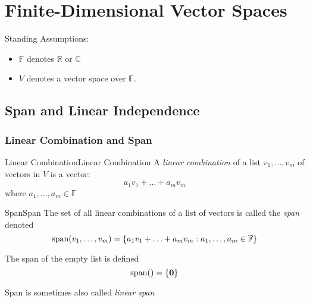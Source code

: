 \documentclass[../main.tex]{subfiles}
\begin{document}
\chapter{Finite-Dimensional Vector Spaces}

\begin{plainblackenv}
Standing Assumptions:
\tcblower\par
\begin{itemize}
\item $\mathbb{F}$ denotes $\mathbb{R}$ or $\mathbb{C}$ 
\item $V$ denotes a vector space over $\mathbb{F}$.
\end{itemize}
\end{plainblackenv}

\section{Span and Linear Independence}
\subsection{Linear Combination and Span}

\begin{definition}{Linear Combination}{Linear Combination}
A \emph{linear combination} of a list $v_1, \ldots ,v_m$ of vectors in $V$ is a vector:
\begin{equation}
a_1v_1+\ldots +a_mv_m
\end{equation}
where $a_1, \ldots ,a_m \in \mathbb{F}$
\end{definition}

\begin{definition}{Span}{Span}
The set of all linear combinations of a list of vectors is called the \emph{span} denoted
\begin{equation}
	\operatorname{span}(v_1, \ldots ,v_m) = \left\{ a_1v_1+\ldots +a_mv_m : a_1, \ldots ,a_m \in \mathbb{F} \right\}
\end{equation}

The span of the empty list is defined
\begin{equation}
\operatorname{span}() = \left\{ \boldsymbol{0} \right\}
\end{equation}

Span is sometimes also called \emph{linear span}
\end{definition}
\end{document}
